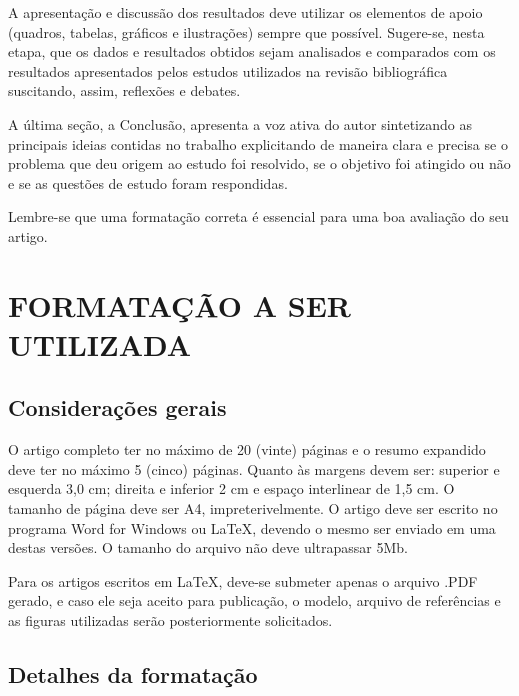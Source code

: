 \documentclass{sep}
\begin{document}
A apresentação e discussão dos resultados deve utilizar os elementos de apoio (quadros, tabelas, gráficos e ilustrações) sempre que possível.
Sugere-se, nesta etapa, que os dados e resultados obtidos sejam analisados e comparados com os resultados apresentados pelos estudos utilizados na revisão bibliográfica suscitando, assim, reflexões e debates.

A última seção, a Conclusão, apresenta a voz ativa do autor sintetizando as principais ideias contidas no trabalho explicitando de maneira clara e precisa se o problema que deu origem ao estudo foi resolvido, se o objetivo foi atingido ou não e se as questões de estudo foram respondidas.

Lembre-se que uma formatação correta é essencial para uma boa avaliação do seu artigo.

\section{FORMATAÇÃO A SER UTILIZADA}

\subsection{Considerações gerais}

O artigo completo ter no máximo de 20 (vinte) páginas e o resumo expandido deve ter no máximo 5 (cinco) páginas.
Quanto às margens devem ser: superior e esquerda 3,0 cm; direita e inferior 2 cm e espaço interlinear de 1,5 cm.
O tamanho de página deve ser A4, impreterivelmente.
O artigo deve ser escrito no programa Word for Windows ou \LaTeX, devendo o mesmo ser enviado em uma destas
versões.
O tamanho do arquivo não deve ultrapassar 5Mb.

Para os artigos escritos em \LaTeX, deve-se submeter apenas o arquivo .PDF gerado, e caso ele seja aceito para publicação, o modelo, arquivo de referências e as figuras utilizadas serão posteriormente solicitados.

\subsection{Detalhes da formatação}
\end{document}
